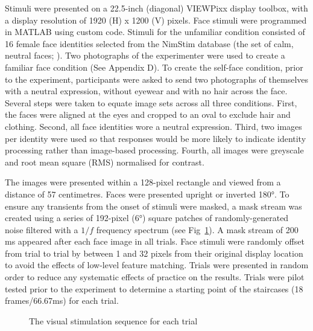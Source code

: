 \documentclass[
  10pt,
  letterpaper,
]{article}
\begin{document}
Stimuli were presented on a 22.5-inch (diagonal) VIEWPixx display
toolbox, with a display resolution of 1920 (H) x 1200 (V) pixels. Face
stimuli were programmed in MATLAB using custom code. Stimuli for the
unfamiliar condition consisted of 16 female face identities selected
from the NimStim database (the set of calm, neutral faces;
\citet{tottenham2009a}). Two photographs of the experimenter were used
to create a familiar face condition (See Appendix D). To create the
self-face condition, prior to the experiment, participants were asked to
send two photographs of themselves with a neutral expression, without
eyewear and with no hair across the face. Several steps were taken to
equate image sets across all three conditions. First, the faces were
aligned at the eyes and cropped to an oval to exclude hair and clothing.
Second, all face identities wore a neutral expression. Third, two images
per identity were used so that responses would be more likely to
indicate identity processing rather than image-based processing. Fourth,
all images were greyscale and root mean square (RMS) normalised for
contrast.

The images were presented within a 128-pixel rectangle and viewed from a
distance of 57 centimetres. Faces were presented upright or inverted
180°. To ensure any transients from the onset of stimuli were masked, a
mask stream was created using a series of 192-pixel (6°) square patches
of randomly-generated noise filtered with a \(1/f\) frequency spectrum
(see Fig~\ref{fig-procedure}). A mask stream of 200 ms appeared after
each face image in all trials. Face stimuli were randomly offset from
trial to trial by between 1 and 32 pixels from their original display
location to avoid the effects of low-level feature matching. Trials were
presented in random order to reduce any systematic effects of practice
on the results. Trials were pilot tested prior to the experiment to
determine a starting point of the staircases (18 frames/66.67ms) for
each trial.

\begin{figure}


\caption{\label{fig-procedure}The visual stimulation sequence for each
trial}

\end{figure}%
\end{document}
